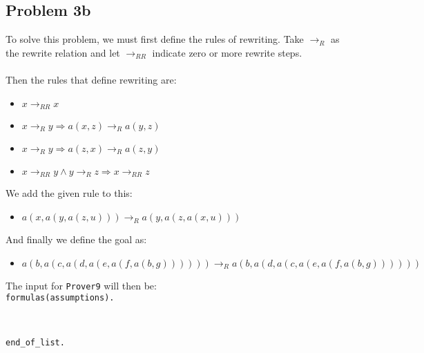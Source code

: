 \documentclass[a4paper]{article}
\begin{document}
	\subsection*{Problem 3b}
	To solve this problem, we must first define the rules of rewriting. Take $\rightarrow_R$ as the rewrite relation and let $\rightarrow_{RR}$ indicate zero or more rewrite steps.\\
	\\
	Then the rules that define rewriting are:
	\begin{itemize}
		\item $x \rightarrow_{RR} x$
		\item $x \rightarrow_R y \Rightarrow a(x, z) \rightarrow_R a(y, z)$
		\item $x \rightarrow_R y \Rightarrow a(z, x) \rightarrow_R a(z, y)$
		\item $x \rightarrow_{RR} y \wedge y \rightarrow_{R} z \Rightarrow x \rightarrow_{RR} z$
	\end{itemize}
	We add the given rule to this:
	\begin{itemize}
		\item $a(x, a(y, a(z, u))) \rightarrow_{R} a(y, a(z, a(x, u)))$
	\end{itemize}
	And finally we define the goal as:
	\begin{itemize}
		\item $a(b, a(c, a(d, a(e, a(f, a(b, g)))))) \rightarrow_R a(b, a(d, a(c, a(e, a(f, a(b, g))))))$
		    
	\end{itemize}
	
	\noindent The input for {\tt Prover9} will then be:\\
	
	{\tt formulas(assumptions).}
	
	\indent {}
	
	\indent {}
	
	\indent {}
	
	\indent {}
	
	\indent {}\\
	
	\indent {}
	
	\indent {}
	
	{\tt end\_of\_list.}
	
\end{document}
